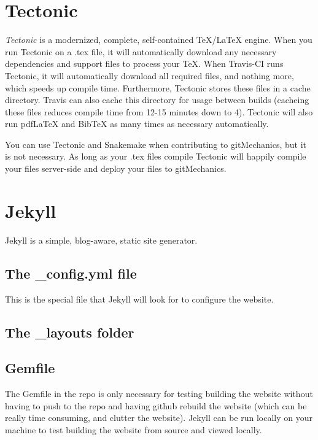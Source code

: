 \documentclass[landscape, twocolumn, 12pt]{article}
\begin{document}
\section{Tectonic}
\textit{Tectonic} is a modernized, complete, self-contained \TeX{}/\LaTeX{} engine. When you run Tectonic on a .tex file, it will automatically download any necessary dependencies and support files to process your \TeX{}. When Travis-CI runs Tectonic, it will automatically download all required files, and nothing more, which speeds up compile time. Furthermore, Tectonic stores these files in a cache directory. Travis can also cache this directory for usage between builds (cacheing these files reduces compile time from 12-15 minutes down to 4). Tectonic will also run pdfLaTeX and BibTeX as many times as necessary automatically.

You can use Tectonic and Snakemake when contributing to gitMechanics, but it is not necessary. As long as your .tex files compile Tectonic will happily compile your files server-side and deploy your files to gitMechanics.

\section{Jekyll}
Jekyll is a simple, blog-aware, static site generator.

\subsection{The \_config.yml file}
This is the special file that Jekyll will look for to configure the website.

\subsection{The \_layouts folder}


\subsection{Gemfile}
The Gemfile in the repo is only necessary for testing building the website without having to push to the repo and having github rebuild the website (which can be really time consuming, and clutter the website). Jekyll can be run locally on your machine to test building the website from source and viewed locally.






%
%
\end{document}
